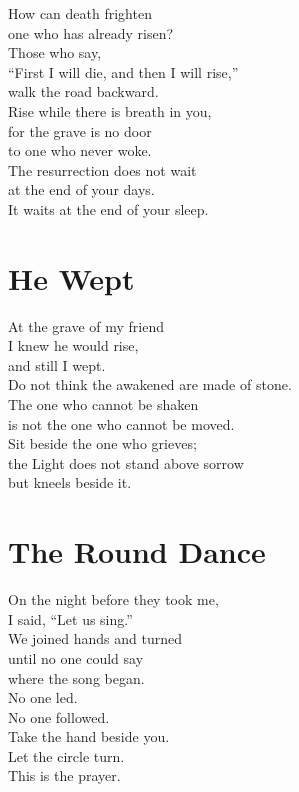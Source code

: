 \documentclass[10pt, openright]{book}
\newcommand{\sectionbreak}{\filbreak}
\newcommand{\sayingsource}[1]{\par\nopagebreak\vspace{0.3\baselineskip}{\raggedleft\footnotesize\itshape #1\par}}
\begin{document}
How can death frighten\\
one who has already risen?\\
Those who say,\\
``First I will die, and then I will rise,''\\
walk the road backward.\\
Rise while there is breath in you,\\
for the grave is no door\\
to one who never woke.\\
The resurrection does not wait\\
at the end of your days.\\
It waits at the end of your sleep.

\sayingsource{Tao Te Ching 74 · Philip}

\sectionbreak

\section{He Wept}\label{he-wept}

At the grave of my friend\\
I knew he would rise,\\
and still I wept.\\
Do not think the awakened are made of stone.\\
The one who cannot be shaken\\
is not the one who cannot be moved.\\
Sit beside the one who grieves;\\
the Light does not stand above sorrow\\
but kneels beside it.

\sayingsource{John 11:35}

\sectionbreak

\section{The Round Dance}\label{the-round-dance}

On the night before they took me,\\
I said, ``Let us sing.''\\
We joined hands and turned\\
until no one could say\\
where the song began.\\
No one led.\\
No one followed.\\
Take the hand beside you.\\
Let the circle turn.\\
This is the prayer.
\end{document}
